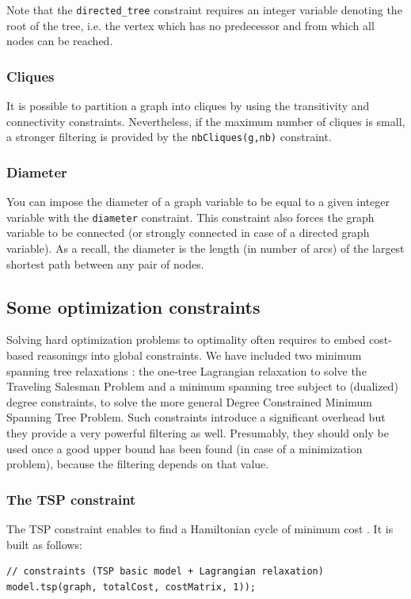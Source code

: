 \documentclass{article}
\begin{document}
Note that the \texttt{directed\_tree} constraint \cite{FagesCP11} requires an integer variable denoting the root of the tree, i.e. the vertex which has no predecessor and from which all nodes can be reached. 

\subsubsection{Cliques}

It is possible to partition a graph into cliques by using the transitivity and connectivity constraints. Nevertheless, if the maximum number of cliques is small, a stronger filtering is provided by the \texttt{nbCliques(g,nb)} constraint. 

\subsubsection{Diameter}

You can impose the diameter of a graph variable to be equal to a given integer variable with the \texttt{diameter} constraint. This constraint also forces the graph variable to be connected (or strongly connected in case of a directed graph variable). As a recall, the diameter is the length (in number of arcs) of the largest shortest path between any pair of nodes. 

\subsection{Some optimization constraints}

Solving hard optimization problems to optimality often requires to embed cost-based reasonings into global constraints. 
We have included two minimum spanning tree relaxations : the one-tree Lagrangian relaxation to solve the Traveling Salesman Problem and a minimum spanning tree subject to (dualized) degree constraints, to solve the more general Degree Constrained Minimum Spanning Tree Problem. Such constraints introduce a significant overhead but they provide a very powerful filtering as well. Presumably, they should only be used once a good upper bound has been found (in case of a minimization problem), because the filtering depends on that value. 

\subsubsection{The TSP constraint}

The TSP constraint enables to find a Hamiltonian cycle of minimum cost \cite{Benchimol12}. It is built as follows:
\begin{lstlisting}
// constraints (TSP basic model + Lagrangian relaxation)
model.tsp(graph, totalCost, costMatrix, 1));
\end{lstlisting}
\end{document}
